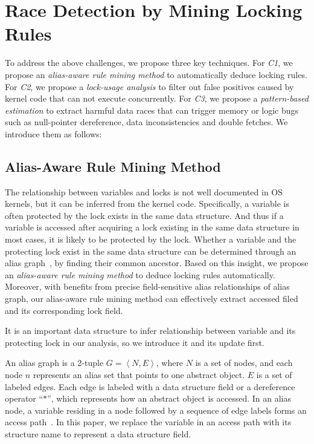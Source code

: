 \section{Race Detection by Mining Locking Rules}
\label{sec_technique}
To address the above challenges, we propose three key techniques. For {\em C1}, 
we propose an {\em alias-aware rule mining method} to automatically deduce 
locking rules. For {\em C2}, we propose a {\em lock-usage analysis} to filter 
out false positives caused by kernel code that can not execute concurrently. 
For {\em C3}, we propose a {\em pattern-based estimation} to extract harmful 
data races that can trigger memory or logic bugs such as null-pointer 
dereference, data inconsistencies and double fetches. We introduce them as 
follows:

\subsection{Alias-Aware Rule Mining Method}
\label{subsec_rule_mining}
The relationship between variables and locks is not well documented in OS 
kernels, but it can be inferred from the kernel code. Specifically, a variable 
is often protected by the lock exists in the same data structure. And thus if a 
variable is accessed after acquiring a lock existing in the same data structure 
in most cases, it is likely to be protected by the lock. Whether a variable and 
the protecting lock exist in the same data structure can be determined through 
an alias graph~\cite{Li:ASPLOS22, Kastrinis:CC18}, by finding their common 
ancestor. Based on this insight, we propose an {\em alias-aware rule mining 
method} to deduce locking rules automatically. Moreover, with benefits from 
precise field-sensitive alias relationships of alias graph, our alias-aware 
rule mining method can effectively extract accessed filed and its corresponding 
lock field.

 It is an important data structure to infer relationship 
between variable and its protecting lock in our analysis, so we introduce it 
and its update first. 

An alias graph is a 2-tuple $\mathit{G = \left<N, E\right>}$, where 
$\mathit{N}$ is a set of nodes, and each node $\mathit{n}$ represents an alias 
set that points to one abstract object. $\mathit{E}$ is a set of labeled edges. 
Each edge is labeled with a data structure field or a dereference operator 
``$\mathit{*}$'', which represents how an abstract object is accessed. In an 
alias node, a variable residing in a node followed by a sequence of edge
labels forms an access path~\cite{Kastrinis:CC18, Cheng:PLDI00}. In this paper, 
we replace the variable in an access path with its structure name to represent 
a data structure field.

